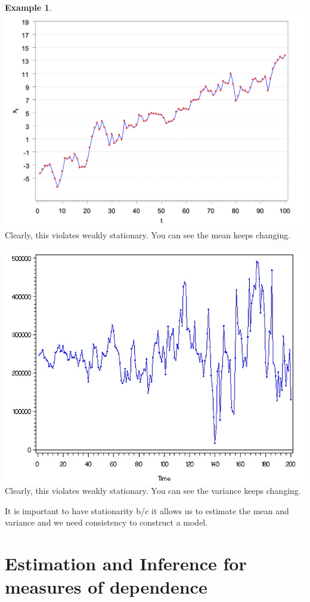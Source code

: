 \documentclass[
]{book}
\theoremstyle{definition}
\theoremstyle{definition}
\newtheorem{example}{Example}[chapter]
\theoremstyle{definition}
\theoremstyle{definition}
\theoremstyle{remark}
\begin{document}
\begin{example}
\includegraphics{Stationarity-graph3.png}
Clearly, this violates weakly stationary. You can see the mean keeps changing.

\includegraphics{Stationarity-graph4.jpg}
Clearly, this violates weakly stationary. You can see the variance keeps changing.
\end{example}

It is important to have stationarity b/c it allows us to estimate the mean and variance and we need consistency to construct a model.

\hypertarget{estimation-and-inference-for-measures-of-dependence}{%
\chapter{Estimation and Inference for measures of dependence}\label{estimation-and-inference-for-measures-of-dependence}}
\end{document}
